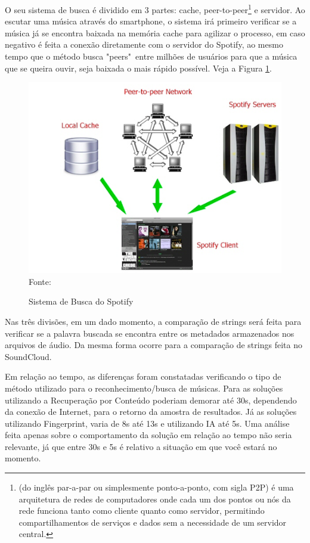 O seu sistema de busca é dividido em 3 partes: cache, peer-to-peer\footnote{(do inglês par-a-par ou simplesmente ponto-a-ponto, com sigla P2P) é uma arquitetura de redes de computadores onde cada um dos pontos ou nós da rede funciona tanto como cliente quanto como servidor, permitindo compartilhamentos de serviços e dados sem a necessidade de um servidor central.} e servidor. Ao escutar uma música através do smartphone, o sistema irá primeiro verificar se a música já se encontra baixada na memória cache para agilizar o processo, em caso negativo é feita a conexão diretamente com o servidor do Spotify, ao mesmo tempo que o método busca "peers"\ entre milhões de usuários para que a música que se queira ouvir, seja baixada o mais rápido possível. Veja a Figura \ref{fig:spotifyp2p}.

\begin{figure}[!htb]
   \centering
   \caption{Sistema de Busca do Spotify}\label{fig:spotifyp2p} 
   \includegraphics[scale=0.8]{figuras/spotifyp2p.png}
   \\Fonte: \cite{kreitz2010}
\end{figure}

Nas três divisões, em um dado momento, a comparação de strings será feita para verificar se a palavra buscada se encontra entre os metadados armazenados nos arquivos de áudio. Da mesma forma ocorre para a comparação de strings feita no SoundCloud.

Em relação ao tempo, as diferenças foram constatadas verificando o tipo de método utilizado para o reconhecimento/busca de músicas. Para as soluções utilizando a Recuperação por Conteúdo poderiam demorar até 30s, dependendo da conexão de Internet, para o retorno da amostra de resultados. Já as soluções utilizando Fingerprint, varia de 8s até 13s e utilizando IA até 5s. Uma análise feita apenas sobre o comportamento da solução em relação ao tempo não seria relevante, já que entre 30s e 5s é relativo a situação em que você estará no momento.

